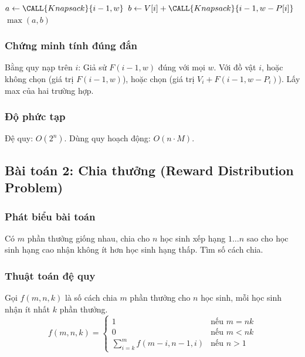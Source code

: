 \documentclass{article}
\begin{document}
\begin{algorithm}[H]
\caption{Knapsack đệ quy}
\begin{algorithmic}
      \ENDIF
     \RETURN {}
    \ELSE
        \STATE $a \leftarrow \CALL{Knapsack}{i-1, w}$
        \STATE $b \leftarrow V[i] + \CALL{Knapsack}{i-1, w-P[i]}$
        \RETURN $\max(a,b)$
    \ENDIF
\ENDPROCEDURE
\end{algorithmic}
\end{algorithm}

\subsubsection*{Chứng minh tính đúng đắn}
Bằng quy nạp trên $i$: Giả sử $F(i-1, w)$ đúng với mọi $w$. Với đồ vật $i$, hoặc không chọn (giá trị $F(i-1,w)$), hoặc chọn (giá trị $V_i + F(i-1, w-P_i)$). Lấy max của hai trường hợp.

\subsubsection*{Độ phức tạp}
Đệ quy: $O(2^n)$. Dùng quy hoạch động: $O(n \cdot M)$.

\subsection*{Bài toán 2: Chia thưởng (Reward Distribution Problem)}

\subsubsection*{Phát biểu bài toán}
Có $m$ phần thưởng giống nhau, chia cho $n$ học sinh xếp hạng $1 \dots n$ sao cho học sinh hạng cao nhận không ít hơn học sinh hạng thấp. Tìm số cách chia.

\subsubsection*{Thuật toán đệ quy}
Gọi $f(m, n, k)$ là số cách chia $m$ phần thưởng cho $n$ học sinh, mỗi học sinh nhận ít nhất $k$ phần thưởng.
\[
f(m, n, k) = 
\begin{cases}
1 & \text{nếu } m = nk \\
0 & \text{nếu } m < nk \\
\sum_{i=k}^{m} f(m-i, n-1, i) & \text{nếu } n > 1
\end{cases}
\]
\end{document}
